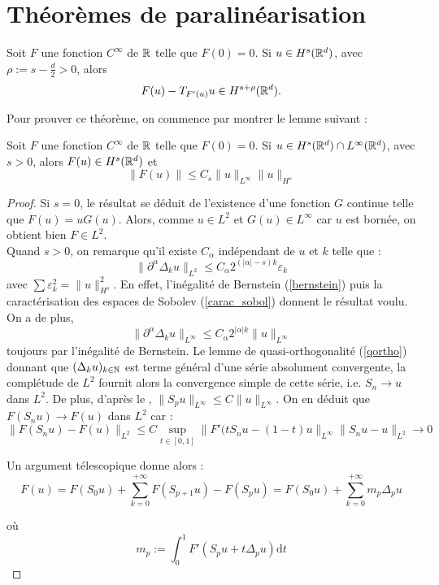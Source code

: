 \documentclass[11pt,a4paper]{article}
\begin{document}
\section{Théorèmes de paralinéarisation}

\begin{thm}\label{paralin}
Soit $F$ une fonction $C^{\infty}$ de $\mathbb R$ telle que $F(0)=0$. Si $u\in H^s(\mathbb R^d)$, avec $\rho := s - \frac{d}{2}>0 $, alors 
\begin{equation}
F(u) - T_{F'(u)}u \in H^{s+\rho}(\mathbb R^d).
\end{equation}
\end{thm}
Pour prouver ce théorème, on commence par montrer le lemme suivant : 

\begin{lemma}
Soit $F$ une fonction $C^{\infty}$ de $\mathbb R$ telle que $F(0)=0$. Si $u\in H^s(\mathbb R^d)\cap L^{\infty}(\mathbb R^d) $, avec $s>0 $, alors $F(u) \in H^s(\mathbb R^d)$ et 
\begin{equation}
\|F(u)\| \leq C_s \|u\|_{L^{\infty}} \|u\|_{H^s}
\end{equation}
\end{lemma}

\begin{proof}
Si $s=0$, le résultat se déduit de l'existence d'une fonction $G$ continue telle que $F(u)=uG(u)$. Alors, comme $u\in L^2$ et $G(u) \in L^{\infty}$ car $u$ est bornée, on obtient bien $F\in L^2$. \\
Quand $s>0$, on remarque qu'il existe $C_\alpha$  indépendant de $u$ et $k$ telle que  : 
\begin{equation}
\|\partial^\alpha \Delta_k u \|_{L^2} \leq C_\alpha 2^{(|\alpha|-s)k} \varepsilon_k
\end{equation}
avec $\sum \varepsilon_k^2 =  \|u\|_{H^s}^2$. En effet, l'inégalité de Bernstein (\ref{bernstein}) puis la caractérisation des espaces de Sobolev (\ref{carac_sobol}) donnent le résultat voulu. On a de plus,
\begin{equation}
\|\partial^\alpha \Delta_k u \|_{L^{\infty}} \leq C_\alpha 2^{|\alpha|k} \|u\|_{L^{\infty}}
\end{equation}
toujours par l'inégalité de Bernstein. Le lemme de quasi-orthogonalité (\ref{qortho}) donnant que $(\Delta_k u)_{k\in \mathbb N}$ est terme général d'une série absolument convergente, la complétude de $L^2$ fournit alors la convergence simple de cette série, i.e. $S_n \to u$ dans $L^2$. De plus, d'après le ,  $\|S_pu\|_{L^\infty} \leq C \|u\|_{L^\infty}$. On en déduit que $F(S_nu) \to F(u)$ dans $L^2$ car :
\[ \| F(S_nu) - F(u)\|_{L^2} \leq C \sup_{t\in[0,1]} \|F'(tS_nu- (1-t)u \|_{L^\infty}\|S_nu-u\|_{L^2} \to 0 \]

Un argument télescopique donne alors : 
\begin{equation*}
F(u) = F(S_0 u) + \sum_{k=0}^{+\infty} F(S_{p+1} u) - F(S_p u) = F(S_0 u) + \sum_{k=0}^{+\infty} m_p \Delta_p u
\end{equation*}

où \[m_p := \int_0^1 F'(S_pu + t\Delta_pu)\mathrm{d}t\]




\end{proof}


\newpage
\printbibliography[heading=bibintoc, title={Références}]
\end{document}
